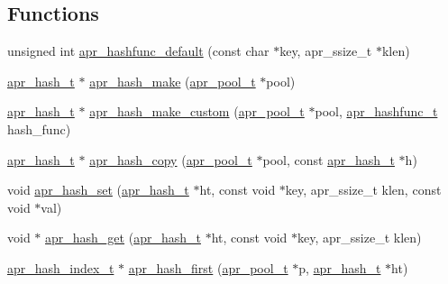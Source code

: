 \subsection*{Functions}
\begin{DoxyCompactItemize}
\item 
unsigned int \hyperlink{group__apr__hash_ga8baa6e9d9d6c2c496d2a0ff1a5c53abe}{apr\-\_\-hashfunc\-\_\-default} (const char $\ast$key, apr\-\_\-ssize\-\_\-t $\ast$klen)
\item 
\hyperlink{group__apr__hash_ga72ec09b8bde6d874c36bd49df915fff6}{apr\-\_\-hash\-\_\-t} $\ast$ \hyperlink{group__apr__hash_ga5f4b424d6761de4d32aa16ff6803bac9}{apr\-\_\-hash\-\_\-make} (\hyperlink{group__apr__pools_gaf137f28edcf9a086cd6bc36c20d7cdfb}{apr\-\_\-pool\-\_\-t} $\ast$pool)
\item 
\hyperlink{group__apr__hash_ga72ec09b8bde6d874c36bd49df915fff6}{apr\-\_\-hash\-\_\-t} $\ast$ \hyperlink{group__apr__hash_ga27f40acb206f1821a783ddcb71bc8971}{apr\-\_\-hash\-\_\-make\-\_\-custom} (\hyperlink{group__apr__pools_gaf137f28edcf9a086cd6bc36c20d7cdfb}{apr\-\_\-pool\-\_\-t} $\ast$pool, \hyperlink{group__apr__hash_ga083e92cab31343c1ebb9073275e8166e}{apr\-\_\-hashfunc\-\_\-t} hash\-\_\-func)
\item 
\hyperlink{group__apr__hash_ga72ec09b8bde6d874c36bd49df915fff6}{apr\-\_\-hash\-\_\-t} $\ast$ \hyperlink{group__apr__hash_gafa0b1b9fb91b2249ee3bcb645d93e148}{apr\-\_\-hash\-\_\-copy} (\hyperlink{group__apr__pools_gaf137f28edcf9a086cd6bc36c20d7cdfb}{apr\-\_\-pool\-\_\-t} $\ast$pool, const \hyperlink{group__apr__hash_ga72ec09b8bde6d874c36bd49df915fff6}{apr\-\_\-hash\-\_\-t} $\ast$h)
\item 
void \hyperlink{group__apr__hash_ga456beb139bc548728b49c09c2f89b93c}{apr\-\_\-hash\-\_\-set} (\hyperlink{group__apr__hash_ga72ec09b8bde6d874c36bd49df915fff6}{apr\-\_\-hash\-\_\-t} $\ast$ht, const void $\ast$key, apr\-\_\-ssize\-\_\-t klen, const void $\ast$val)
\item 
void $\ast$ \hyperlink{group__apr__hash_ga05e526dad8afaebe14caea90d906d6ec}{apr\-\_\-hash\-\_\-get} (\hyperlink{group__apr__hash_ga72ec09b8bde6d874c36bd49df915fff6}{apr\-\_\-hash\-\_\-t} $\ast$ht, const void $\ast$key, apr\-\_\-ssize\-\_\-t klen)
\item 
\hyperlink{group__apr__hash_ga3b3d353989f6cea4535630634be147f7}{apr\-\_\-hash\-\_\-index\-\_\-t} $\ast$ \hyperlink{group__apr__hash_ga640005a4ba64a5db039b0b43a8ad4898}{apr\-\_\-hash\-\_\-first} (\hyperlink{group__apr__pools_gaf137f28edcf9a086cd6bc36c20d7cdfb}{apr\-\_\-pool\-\_\-t} $\ast$p, \hyperlink{group__apr__hash_ga72ec09b8bde6d874c36bd49df915fff6}{apr\-\_\-hash\-\_\-t} $\ast$ht)

\end{DoxyCompactItemize}
